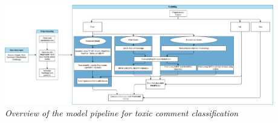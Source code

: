 {
    \centering
    \includegraphics[width=0.88\textwidth]{figures/flowchart.png}
    \vspace{0.5em}
    \small\textit{Overview of the model pipeline for toxic comment classification}
}